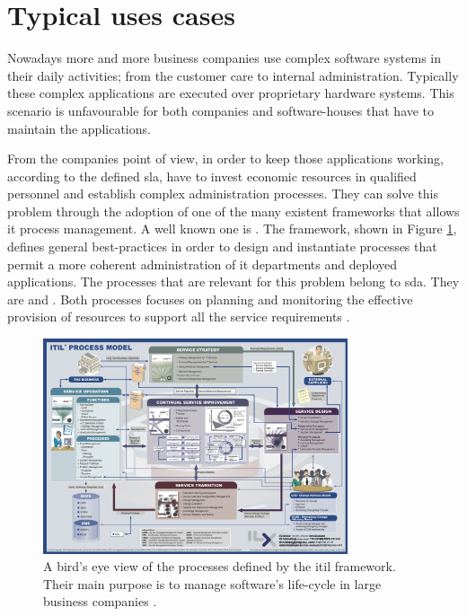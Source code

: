 %
%
\section[Typical use cases]{Typical uses cases}
\label{sec:background-useCases}
Nowadays more and more business companies use complex software systems in their daily activities;
from the customer care to internal administration. Typically these complex applications are executed
over proprietary hardware systems. This scenario is unfavourable for both companies and software-houses
that have to maintain the applications.

From the companies point of view, in order to keep those applications working, according
to the defined \ac{sla}, have to invest economic resources in qualified personnel and establish complex
administration processes. They can solve this problem through the adoption of one of the many existent
frameworks that allows \acs{it} process management. A well known one is .
The framework, shown in Figure \ref{img:background-useCases-itilProcessModel}, defines general
best-practices in order to design and instantiate processes that permit a more coherent 
administration of \acs{it} departments and deployed applications. The processes that are relevant for
this problem belong to \ac{sda}. They are   and . Both processes
focuses on planning and monitoring the effective provision of resources to support all the service
requirements \cite{availabilityCapacityProcesses}.

\begin{figure}
	\centering{}
	\includegraphics[width=0.8\textwidth]{chapters/background/images/itil-map.png}
	\caption[\acs{itil} v3 process model]{A bird's eye view of the processes defined by the \acf{itil} 
		framework. Their main purpose is to manage software's life-cycle in large business companies
		\cite{itilProcessModel}.}
	\label{img:background-useCases-itilProcessModel}
\end{figure}

